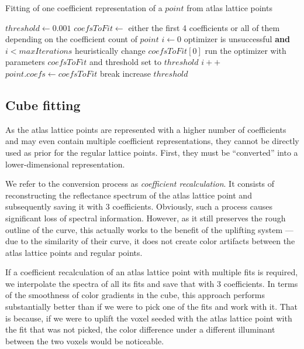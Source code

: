 \begin{algorithm}[t!]
	\caption{Fitting of one coefficient representation of a $point$ from atlas lattice points}
	\label{alg:fitting_alp}
	\begin{algorithmic}[1]
		\State $threshold \gets 0.001$
		\State $coefsToFit \gets$ either the first 4 coefficients or all of them depending on the coefficient count of $point$
		\State $i \gets 0$
		\While optimizer is unsuccessful \textbf{and} $i < maxIterations$
		\State heuristically change $coefsToFit[0]$
		\State run the optimizer with parameters $coefsToFit$ and threshold set to $threshold$
		\State $i++$
		\EndWhile
		\State $point.coefs \gets coefsToFit$
		\State break
		\EndIf
		\State increase $threshold$
		\EndWhile
	\end{algorithmic}
\end{algorithm}

\subsection{Cube fitting} \label{ssec:cubeFitting}

As the atlas lattice points are represented with a higher number of coefficients and may even contain multiple coefficient representations, they cannot be directly used as prior for the regular lattice points. First, they must be ``converted'' into a lower-dimensional representation.

We refer to the conversion process as \emph{coefficient recalculation}. It consists of reconstructing the reflectance spectrum of the atlas lattice point and subsequently saving it with 3 coefficients. Obviously, such a process causes significant loss of spectral information. However, as it still preserves the rough outline of the curve, this actually works to the benefit of the uplifting system --- due to the similarity of their curve, it does not create color artifacts between the atlas lattice points and regular points.

If a coefficient recalculation of an atlas lattice point with multiple fits is required, we interpolate the spectra of all its fits and save that with 3 coefficients. In terms of the smoothness of color gradients in the cube, this approach performs substantially better than if we were to pick one of the fits and work with it. That is because, if we were to uplift the voxel seeded with the atlas lattice point with the fit that was not picked, the color difference under a different illuminant between the two voxels would be noticeable.

